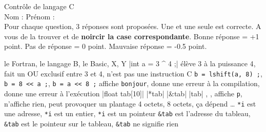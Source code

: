 \documentclass[10pt]{article}
\begin{document}
\parindent=0pt
\begin{center}
Contrôle de langage C \\

\vspace{5mm}
Nom : \hspace{5cm}
Prénom :   \\

\vspace{5mm}
{\small Pour chaque question, 3 réponses sont proposées. Une et une seule est correcte. A vous de la trouver et de \textbf{noircir la case correspondante}. 
Bonne réponse = +1 point. Pas de réponse = 0 point. Mauvaise réponse = -0.5 point.}
\begin{alterqcm}[lq=90mm,title,num=true,alea,long] 

{{le Fortran},%
 {le langage B},%
 {le Basic},%
 {X},%
 {Y}}
\verbdef\arg|int a = 3 ^ 4 ;|
\AQquestion{\arg}
{{élève 3 à la puissance 4},
 {fait un OU exclusif entre 3 et 4},
 {n'est pas une instruction C}}
%--------------------------------------------------------------
{{\texttt{b = lshift(a, 8) ;}},
 {\texttt{b = 8 << a ;}},
 {\texttt{b = a << 8 ;}}}
%--------------------------------------------------------------
{{affiche \texttt{bonjour}},
  {donne une erreur à la compilation},
 {donne une erreur à l'exécution}}
\verbdef\arg|float tab[10]|
\verbdef\propa|*tab|\global\let\propa\propa
\verbdef\propb|&tab|\global\let\propb\propb
\verbdef\propc|tab|\global\let\propc\propc
{}
{{\propa},
 {\propb},
 {\propc}}
{{affiche \texttt{p}},
 {n'affiche rien},
 {peut provoquer un plantage}}
{{4 octets},
 {8 octets},
 {ça dépend \ldots}}
{{\texttt{*i} est une adresse},
 {\texttt{*i} est un entier},
 {\texttt{*i} est un pointeur}}
{{\texttt{\&tab} est l'adresse du tableau},
 {\texttt{\&tab} est le pointeur sur le tableau},
 {\texttt{\&tab} ne signifie rien}}


\end{alterqcm}
\end{center}
\end{document}
